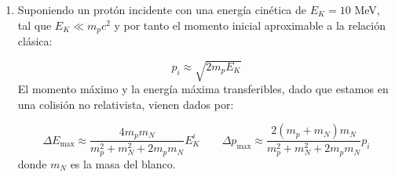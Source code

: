 \begin{enumerate}[label=\alph*)]
    \item Suponiendo un protón incidente con una energía cinética de $E_K=10$ MeV, tal que $E_K\ll m_p c^2$ y por tanto el momento inicial aproximable a la relación clásica:

    \begin{equation*}
        p_i \approx \sqrt{2 m_p E_K} 
    \end{equation*}
    El momento máximo y la energía máxima transferibles, dado que estamos en una colisión no relativista, vienen dados por: 

    \begin{equation*}
        \Delta E_{\max} \approx \frac{4m_p m_N}{m_p^2 + m_N^2 + 2m_p m_N} E_K^i \qquad 
        \Delta p_{\max} \approx \frac{2(m_p+m_N)m_N}{m_p^2 + m_N^2 + 2m_p m_N} p_i
    \end{equation*}
    donde $m_N$ es la masa del blanco. 


\end{enumerate}

